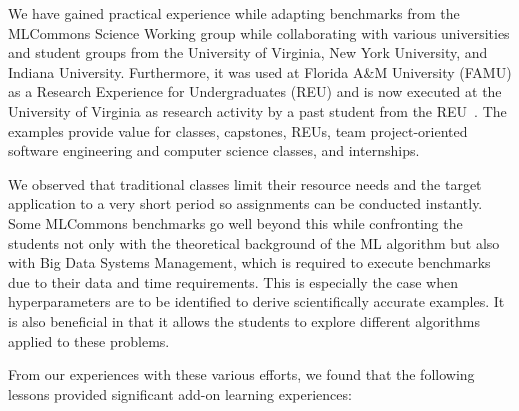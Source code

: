 \documentclass[utf8]{FrontiersinVancouver} %
\begin{document}
We have gained practical experience while adapting benchmarks from the MLCommons Science Working group while collaborating with various universities and student groups from the University of Virginia, New York University, and Indiana University. Furthermore, it was used at Florida A\&M University (FAMU) as a Research Experience for Undergraduates (REU) and is now executed at the University of Virginia as research activity by a past student from the REU~\cite{las-2022-mdpi-crypto}. The examples provide value for classes, capstones, REUs, team project-oriented software engineering and computer science classes, and internships.

We observed that traditional classes limit their resource needs and the target application to a very short period so assignments can be conducted instantly.  Some MLCommons benchmarks go well beyond this while confronting the students not only with the theoretical background of the ML algorithm but also with Big Data Systems Management, which is required to execute benchmarks due to their data and time requirements. This is especially the case when hyperparameters are to be identified to derive scientifically accurate examples. It is also beneficial in that it allows the students to explore different algorithms applied to these problems.

From our experiences with these various efforts, we found that the following lessons provided significant add-on learning experiences:
\end{document}
